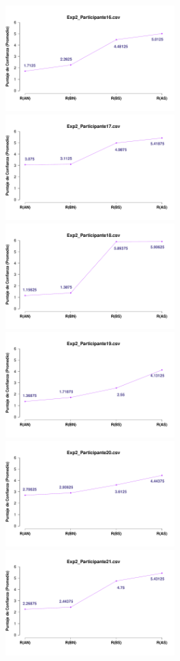 \documentclass[a4paper ]{article}
\begin{document}
\begin{figure}[th]
\begin{center}
\includegraphics[width=8cm, height=4cm]{Figures/MirrorRating_Exp2_P16} \includegraphics[width=8cm, height=4cm]{Figures/MirrorRating_Exp2_P17} \includegraphics[width=8cm, height=4cm]{Figures/MirrorRating_Exp2_P18}
\includegraphics[width=8cm, height=4cm]{Figures/MirrorRating_Exp2_P19} \includegraphics[width=8cm, height=4cm]{Figures/MirrorRating_Exp2_P20} \includegraphics[width=8cm, height=4cm]{Figures/MirrorRating_Exp2_P21}
\end{center}
\end{figure}
\clearpage
\end{document}
